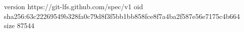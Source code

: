 version https://git-lfs.github.com/spec/v1
oid sha256:63c22269549b328fa0c79d8f3f5bb1bb858fce8f7a4ba2f587e56e7175c4b664
size 87544
